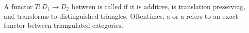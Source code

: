 \begin{definition} \label{definition:exact_functor_between_triangulated_categories}
    A functor $T: D_1 \to D_2$ between  is called  if it is additive, is translation preserving, and transforms  to distinguished triangles. 
    Oftentimes, a  or a  refers to an exact functor between triangulated categories.
\end{definition}